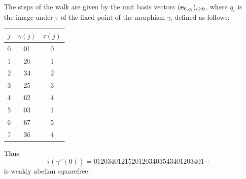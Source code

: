 \documentclass[12pt,reqno]{article}
\begin{document}
\begin{corollary}\label{cor:dim6wordformulation}
The steps of the walk are given by
the unit basis vectors
$({\bf e}_{6,q_i})_{i \geq 0}$,
where $q_i$ is the image under
$\tau$ of the fixed point of the
morphism $\gamma$, defined as follows:
\begin{table}[H]
\centering
\begin{tabular}{c|c|c}
$j$ & $\gamma(j)$ & $\tau(j)$ \\
\hline
0 & 01 & 0 \\
1 & 20 & 1 \\
2 & 34 & 2 \\
3 & 25 & 3 \\
4 & 62 & 4 \\
5 & 03 & 1 \\
6 & 67 & 5 \\
7 & 36 & 4 \\
\end{tabular}
\end{table}
Thus $$\tau(\gamma^\omega(0)) = 01203401215201203403543401203401 \cdots$$ is weakly abelian squarefree.
\end{corollary}
\end{document}
